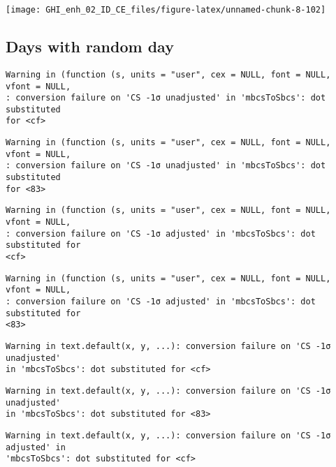 \documentclass[
  10pt,
  a4paper,oneside]{article}
\begin{document}
\begin{center}\texttt{[image: GHI\_enh\_02\_ID\_CE\_files/figure-latex/unnamed-chunk-8-102]} \end{center}

\FloatBarrier

\hypertarget{days-with-random-day}{%
\subsection{Days with random day}\label{days-with-random-day}}

\begin{verbatim}
Warning in (function (s, units = "user", cex = NULL, font = NULL, vfont = NULL,
: conversion failure on 'CS -1σ unadjusted' in 'mbcsToSbcs': dot substituted
for <cf>
\end{verbatim}

\begin{verbatim}
Warning in (function (s, units = "user", cex = NULL, font = NULL, vfont = NULL,
: conversion failure on 'CS -1σ unadjusted' in 'mbcsToSbcs': dot substituted
for <83>
\end{verbatim}

\begin{verbatim}
Warning in (function (s, units = "user", cex = NULL, font = NULL, vfont = NULL,
: conversion failure on 'CS -1σ adjusted' in 'mbcsToSbcs': dot substituted for
<cf>
\end{verbatim}

\begin{verbatim}
Warning in (function (s, units = "user", cex = NULL, font = NULL, vfont = NULL,
: conversion failure on 'CS -1σ adjusted' in 'mbcsToSbcs': dot substituted for
<83>
\end{verbatim}

\begin{verbatim}
Warning in text.default(x, y, ...): conversion failure on 'CS -1σ unadjusted'
in 'mbcsToSbcs': dot substituted for <cf>
\end{verbatim}

\begin{verbatim}
Warning in text.default(x, y, ...): conversion failure on 'CS -1σ unadjusted'
in 'mbcsToSbcs': dot substituted for <83>
\end{verbatim}

\begin{verbatim}
Warning in text.default(x, y, ...): conversion failure on 'CS -1σ adjusted' in
'mbcsToSbcs': dot substituted for <cf>
\end{verbatim}
\end{document}
